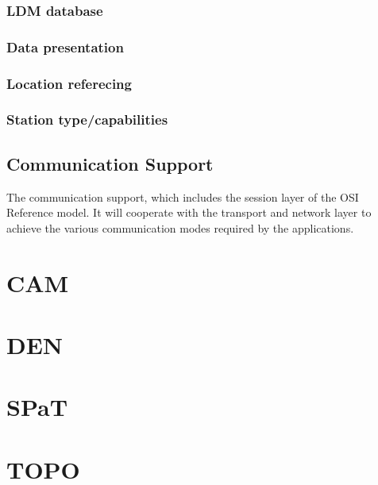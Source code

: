 \subsubsection{LDM database}
\subsubsection{Data presentation}
\subsubsection{Location referecing}
\subsubsection{Station type/capabilities}

\subsection{Communication Support}
The communication support, which includes the session layer of the OSI Reference model. It will
cooperate with the transport and network layer to achieve the various communication modes required by
the applications. 

\section{CAM\label{sec:cam}}

\section{DEN\label{sec:den}}


\section{SPaT\label{sec:spat}}

\section{TOPO\label{sec:topo}}
